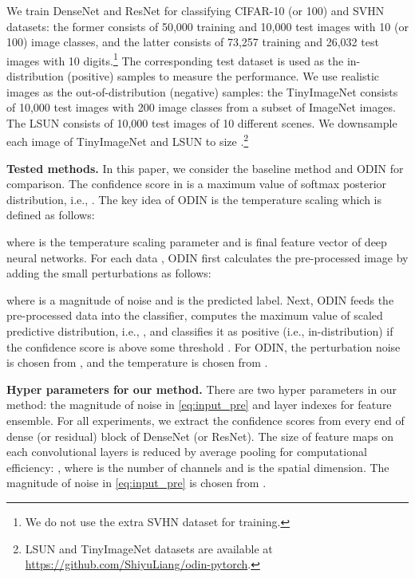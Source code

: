 \documentclass{article}
\begin{document}
We train DenseNet and ResNet for classifying CIFAR-10 (or 100) and SVHN datasets: the former consists of 50,000 training and 10,000 test
images with 10 (or 100) image classes, and the latter consists of 73,257 training and 26,032 test images with 10 digits.\footnote{We do not use the extra SVHN dataset for training.} 
The corresponding test dataset is used as the in-distribution (positive) samples to measure the performance. 
We use realistic images as the out-of-distribution (negative) samples: the TinyImageNet consists of 10,000 test images with 200 image classes from a subset of ImageNet images. The LSUN consists of 10,000 test images of 10 different scenes. We downsample each image of TinyImageNet and LSUN to size .\footnote{LSUN and TinyImageNet datasets are available at \url{https://github.com/ShiyuLiang/odin-pytorch}.}

{\bf Tested methods.}
In this paper, 
we consider the baseline method \citep{hendrycks2016baseline} and ODIN \citep{liang2017principled} for comparison.
The confidence score in \citet{hendrycks2016baseline} is a maximum value of softmax posterior distribution, i.e., .
The key idea of ODIN is the temperature scaling which is defined as follows:

where  is the temperature scaling parameter and  is final feature vector of deep neural networks.
For each data , ODIN first calculates the pre-processed image  by adding the small perturbations as follows:

where  is a magnitude of noise and  is the predicted label.
Next, ODIN feeds the pre-processed data into the classifier, computes the maximum value of scaled predictive distribution, i.e., , and classifies it as positive (i.e., in-distribution) if the confidence score is above some threshold .
For ODIN, the perturbation noise  is chosen from , and the temperature  is chosen from .

{\bf Hyper parameters for our method.} 
There are two hyper parameters in our method: the magnitude of noise in \eqref{eq:input_pre} and layer indexes for feature ensemble.
For all experiments, we extract the confidence scores from every end of dense (or residual) block of DenseNet (or ResNet).
The size of feature maps on each convolutional layers is reduced by average pooling for computational efficiency: , where  is the number of channels and  is the spatial dimension.
The magnitude of noise in \eqref{eq:input_pre} is chosen from . 
\end{document}
